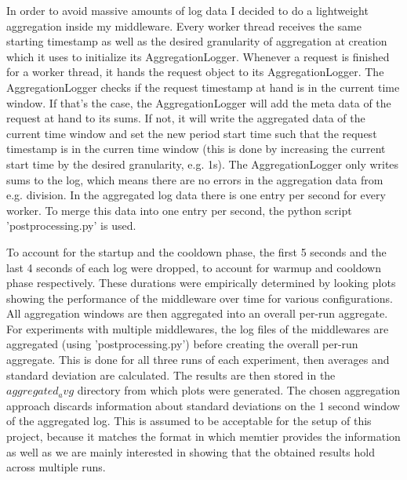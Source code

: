 \documentclass[11pt,a4paper]{article}
\begin{document}
In order to avoid massive amounts of log data I decided to do a lightweight aggregation inside my middleware.
Every worker thread receives the same starting timestamp as well as the desired granularity of aggregation at creation which it uses to initialize its AggregationLogger.
Whenever a request is finished for a worker thread, it hands the request object to its AggregationLogger.
The AggregationLogger checks if the request timestamp at hand is in the current time window.
If that's the case, the AggregationLogger will add the meta data of the request at hand to its sums.
If not, it will write the aggregated data of the current time window and set the new period start time such that the request timestamp is in the curren time window (this is done by increasing the current start time by the desired granularity, e.g. 1s).
The AggregationLogger only writes sums to the log, which means there are no errors in the aggregation data from e.g. division.
In the aggregated log data there is one entry per second for every worker.
To merge this data into one entry per second, the python script 'postprocessing.py' is used.

To account for the startup and the cooldown phase, the first 5 seconds and the last 4 seconds of each log were dropped, to account for warmup and cooldown phase respectively.
These durations were empirically determined by looking plots showing the performance of the middleware over time for various configurations.
All aggregation windows are then aggregated into an overall per-run aggregate.
For experiments with multiple middlewares, the log files of the middlewares are aggregated (using 'postprocessing.py') before creating the overall per-run aggregate.
This is done for all three runs of each experiment, then averages and standard deviation are calculated.
The results are then stored in the $aggregated_avg$ directory from which plots were generated.
The chosen aggregation approach discards information about standard deviations on the 1 second window of the aggregated log.
This is assumed to be acceptable for the setup of this project, because it matches the format in which memtier provides the information as well as we are mainly interested in showing that the obtained results hold across multiple runs.




\end{document}

